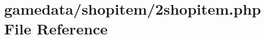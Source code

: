 \hypertarget{2shopitem_8php}{\section{gamedata/shopitem/2shopitem.php File Reference}
\label{2shopitem_8php}
}
